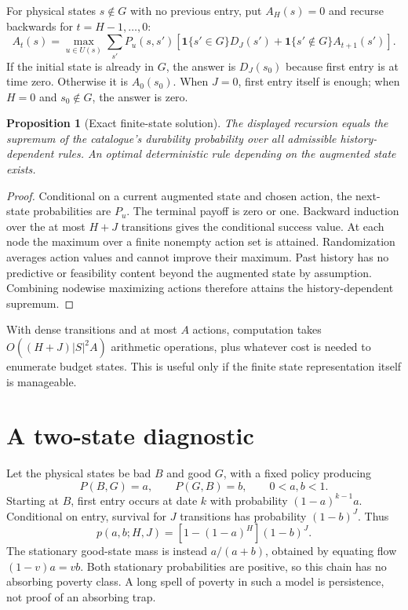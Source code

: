 \documentclass[11pt]{article}
\newtheorem{proposition}{Proposition}
\begin{document}
For physical states $s\notin G$ with no previous entry, put $A_H(s)=0$ and recurse backwards for $t=H-1,\ldots,0$:
\[
 A_t(s)=\max_{u\in U(s)}\sum_{s'}P_u(s,s')
 \left[\mathbf1\{s'\in G\}D_J(s')+
       \mathbf1\{s'\notin G\}A_{t+1}(s')\right].
\]
If the initial state is already in $G$, the answer is $D_J(s_0)$ because first entry is at time zero. Otherwise it is $A_0(s_0)$. When $J=0$, first entry itself is enough; when $H=0$ and $s_0\notin G$, the answer is zero.

\begin{proposition}[Exact finite-state solution]
The displayed recursion equals the supremum of the catalogue's durability probability over all admissible history-dependent rules. An optimal deterministic rule depending on the augmented state exists.
\end{proposition}
\begin{proof}
Conditional on a current augmented state and chosen action, the next-state probabilities are $P_u$. The terminal payoff is zero or one. Backward induction over the at most $H+J$ transitions gives the conditional success value. At each node the maximum over a finite nonempty action set is attained. Randomization averages action values and cannot improve their maximum. Past history has no predictive or feasibility content beyond the augmented state by assumption. Combining nodewise maximizing actions therefore attains the history-dependent supremum.
\end{proof}
With dense transitions and at most $A$ actions, computation takes $O((H+J)|S|^2A)$ arithmetic operations, plus whatever cost is needed to enumerate budget states. This is useful only if the finite state representation itself is manageable.

\section*{A two-state diagnostic}
Let the physical states be bad $B$ and good $G$, with a fixed policy producing
\[
 P(B,G)=a,\qquad P(G,B)=b,\qquad0<a,b<1.
\]
Starting at $B$, first entry occurs at date $k$ with probability $(1-a)^{k-1}a$. Conditional on entry, survival for $J$ transitions has probability $(1-b)^J$. Thus
\[
 p(a,b;H,J)=[1-(1-a)^H](1-b)^J.
\]
The stationary good-state mass is instead $a/(a+b)$, obtained by equating flow $(1-v)a=vb$. Both stationary probabilities are positive, so this chain has no absorbing poverty class. A long spell of poverty in such a model is persistence, not proof of an absorbing trap.
\end{document}
